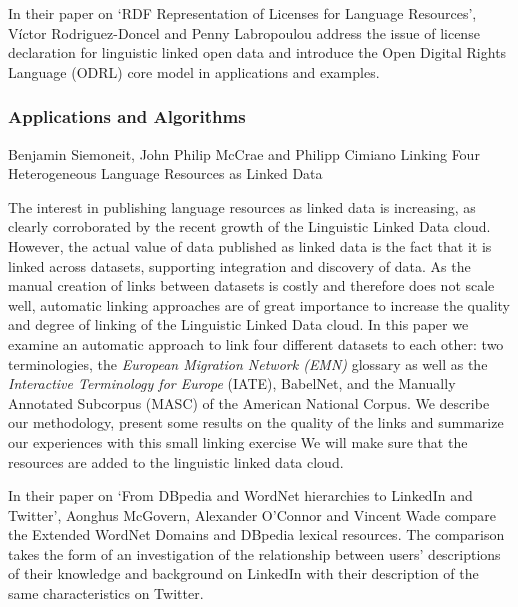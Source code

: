 

    

	In their paper on `RDF Representation of Licenses for Language Resources', Víctor Rodriguez-Doncel and Penny Labropoulou address the issue of license declaration for linguistic linked open data and introduce the Open Digital Rights Language (ODRL) core model in applications and examples.



		


\subsubsection{Applications and Algorithms}

		  Benjamin Siemoneit, John Philip McCrae and Philipp Cimiano
		 Linking Four Heterogeneous Language Resources as Linked Data

		The interest in publishing language resources as linked data is increasing,
		as clearly corroborated by the recent growth of the Linguistic Linked Data
		cloud. However, the actual value of data published as linked data is the
		fact that it is linked across datasets, supporting integration and
		discovery of data. As the manual creation of links between datasets is
		costly and therefore does not scale well, automatic linking approaches are
		of great importance to increase the quality and degree of linking of the
		Linguistic Linked Data cloud. In this paper we examine an automatic
		approach to link four different datasets to each other: two terminologies,
		the \emph{European Migration Network (EMN)} glossary as well as the \emph
		{Interactive Terminology for Europe} (IATE), BabelNet, and the Manually
		Annotated Subcorpus (MASC) of the American National Corpus. We describe our
		methodology, present some results on the quality of the links and summarize
		our experiences with this small linking exercise We will make sure that the
		resources are added to the linguistic linked data cloud.

	In their paper on `From DBpedia and WordNet hierarchies to LinkedIn and Twitter', Aonghus McGovern, Alexander O'Connor and Vincent Wade 
	compare the Extended WordNet Domains and DBpedia lexical resources. The comparison takes the form of an
	investigation of the relationship between users’ descriptions of their
	knowledge and background on LinkedIn with their description of the same
	characteristics on Twitter.
	
